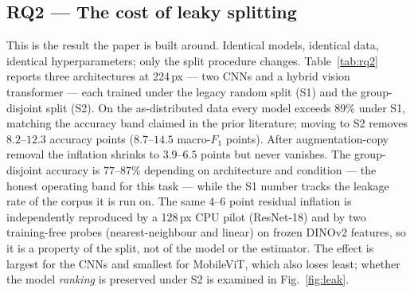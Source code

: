 \documentclass[10pt,twocolumn,a4paper]{article}
\begin{document}
\subsection{RQ2 --- The cost of leaky splitting}
This is the result the paper is built around. Identical models, identical data, identical hyperparameters; only the split procedure changes. Table~\ref{tab:rq2} reports three architectures at 224\,px --- two CNNs and a hybrid vision transformer --- each trained under the legacy random split (S1) and the group-disjoint split (S2). On the as-distributed data every model exceeds $89\%$ under S1, matching the accuracy band claimed in the prior literature; moving to S2 removes $8.2$--$12.3$ accuracy points ($8.7$--$14.5$ macro-$F_1$ points). After augmentation-copy removal the inflation shrinks to $3.9$--$6.5$ points but never vanishes. The group-disjoint accuracy is $77$--$87\%$ depending on architecture and condition --- the honest operating band for this task --- while the S1 number tracks the leakage rate of the corpus it is run on. The same $4$--$6$ point residual inflation is independently reproduced by a 128\,px CPU pilot (ResNet-18) and by two training-free probes (nearest-neighbour and linear) on frozen DINOv2 features, so it is a property of the split, not of the model or the estimator. The effect is largest for the CNNs and smallest for MobileViT, which also loses least; whether the model \emph{ranking} is preserved under S2 is examined in Fig.~\ref{fig:leak}.
\end{document}
